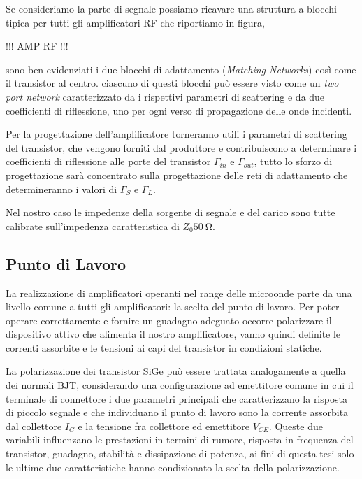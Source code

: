 \documentclass[12pt]{article}
\begin{document}
Se consideriamo la parte di segnale possiamo ricavare una struttura a blocchi tipica per tutti gli amplificatori RF che riportiamo in figura,

!!! AMP RF !!!

sono ben evidenziati i due blocchi di adattamento (\textit{Matching Networks}) così come il transistor al centro. ciascuno di questi blocchi può essere visto come un \textit{two port network} caratterizzato da i rispettivi parametri di scattering e da due coefficienti di riflessione, uno per ogni verso di propagazione delle onde incidenti.

Per la progettazione dell'amplificatore torneranno utili i parametri di scattering del transistor, che vengono forniti dal produttore e contribuiscono a determinare i coefficienti di riflessione alle porte del transistor $\Gamma_{in}$ e $\Gamma_{out}$, tutto lo sforzo di progettazione sarà concentrato sulla progettazione delle reti di adattamento che determineranno i valori di $\Gamma_{S}$ e $\Gamma_{L}$.

Nel nostro caso le impedenze della sorgente di segnale e del carico sono tutte calibrate sull'impedenza caratteristica di $Z_{0}\SI{50}{\ohm}$.

\subsection{Punto di Lavoro}
\label{sub_q_point}
La realizzazione di amplificatori operanti nel range delle microonde parte da una livello comune a tutti gli amplificatori: la scelta del punto di lavoro. Per poter operare correttamente e fornire un guadagno adeguato occorre polarizzare il dispositivo attivo che alimenta il nostro amplificatore, vanno quindi definite le correnti assorbite e le tensioni ai capi del transistor in condizioni statiche.

La polarizzazione dei transistor SiGe può essere trattata analogamente a quella dei normali BJT, considerando una configurazione ad emettitore comune in cui il terminale di connettore i due parametri principali che caratterizzano la risposta di piccolo segnale e che individuano il punto di lavoro sono la corrente assorbita dal collettore $I_C$ e la tensione fra collettore ed emettitore $V_{CE}$. Queste due variabili influenzano le prestazioni in termini di rumore, risposta in frequenza del transistor, guadagno, stabilità e dissipazione di potenza, ai fini di questa tesi solo le ultime due caratteristiche hanno condizionato la scelta della polarizzazione.
\end{document}
